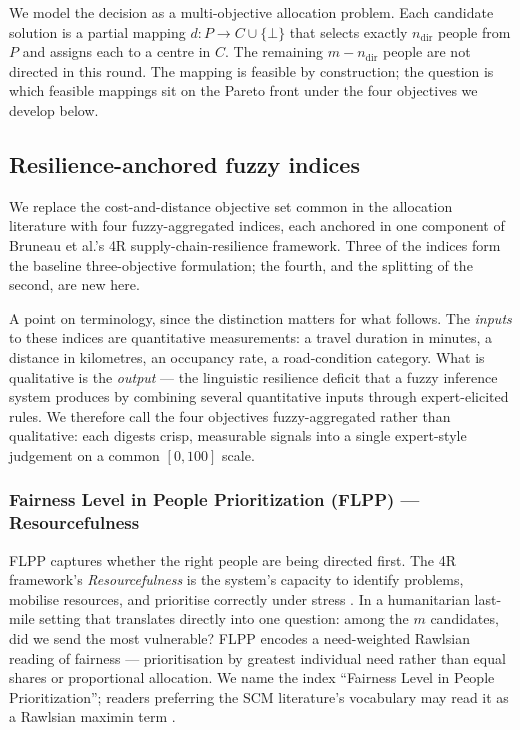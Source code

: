 \documentclass[applsci,article,submit,moreauthors,pdftex]{Definitions/mdpi}
\begin{document}
We model the decision as a multi-objective allocation problem. Each candidate
solution is a partial mapping $d: P \to C \cup \{\bot\}$ that selects exactly
$n_{\mathrm{dir}}$ people from $P$ and assigns each to a centre in $C$. The
remaining $m - n_{\mathrm{dir}}$ people are not directed in this round. The
mapping is feasible by construction; the question is which feasible mappings
sit on the Pareto front under the four objectives we develop below.

\subsection{Resilience-anchored fuzzy indices}\label{sec:model-indices}

We replace the cost-and-distance objective set common in the
allocation literature \cite{tzeng2007, abounacer2014, gama2016, zhao2017}
with four fuzzy-aggregated indices, each anchored in one component of Bruneau et
al.'s \cite{bruneau2003} 4R supply-chain-resilience framework. Three of the
indices form the baseline three-objective formulation; the fourth, and the
splitting of the second, are new here.

A point on terminology, since the distinction matters for what follows. The
\emph{inputs} to these indices are quantitative measurements: a travel duration
in minutes, a distance in kilometres, an occupancy rate, a road-condition
category. What is qualitative is the \emph{output} --- the linguistic resilience
deficit that a fuzzy inference system produces by combining several quantitative
inputs through expert-elicited rules. We therefore call the four objectives
fuzzy-aggregated rather than qualitative: each digests crisp, measurable signals
into a single expert-style judgement on a common $[0,100]$ scale.

\subsubsection{Fairness Level in People Prioritization (FLPP) — Resourcefulness}

FLPP captures whether the right people are being directed first. The 4R
framework's \emph{Resourcefulness} is the system's capacity to identify
problems, mobilise resources, and prioritise correctly under stress
\cite{bruneau2003, hosseini2016}. In a humanitarian last-mile setting that
translates directly into one question: among the $m$ candidates, did we send
the most vulnerable? FLPP encodes a need-weighted Rawlsian reading of
fairness --- prioritisation by greatest individual need rather than equal
shares or proportional allocation. We name the index
``Fairness Level in People Prioritization''; readers
preferring the SCM literature's vocabulary may read it as a Rawlsian
maximin term \cite{soghrati2022}.
\end{document}
